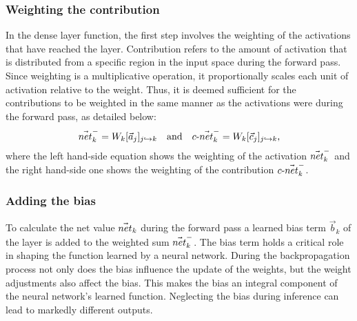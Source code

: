 \subsubsection{Weighting the contribution}
In the dense layer function, the first step involves the weighting of the activations that have reached the layer. Contribution refers to the amount of activation that is distributed from a specific region in the input space during the forward pass. Since weighting is a multiplicative operation, it proportionally scales each unit of activation relative to the weight. Thus, it is deemed sufficient for the contributions to be weighted in the same manner as the activations were during the forward pass, as detailed below:
\begin{equation}
    \vec{net}_{k}^- = W_k [\vec{a}_j]_{j\hookrightarrow k}\quad\mbox{and}\quad
   \text{$c$-}\vec{net}_{k}^- = W_k[\vec{c}_j]_{j\hookrightarrow k},
\label{eq:cnet}
\end{equation}
where the left hand-side equation shows the weighting of the activation $\vec{net}_{k}^-$ and the right hand-side one shows the weighting of the contribution $\text{$c$-}\vec{net}_{k}^-$.
\subsubsection{Adding the bias}
\label{section:adding_the_bias}
To calculate the net value $\vec{net}_{k}$ during the forward pass a learned bias term $\vec{b}_k$ of the layer is added to the weighted sum $\vec{net}_{k}^-$. 
The bias term holds a critical role in shaping the function learned by a neural network. During the backpropagation process not only does the bias influence the update of the weights, but the weight adjustments also affect the bias. This makes the bias an integral component of the neural network's learned function. Neglecting the bias during inference can lead to markedly different outputs. 

